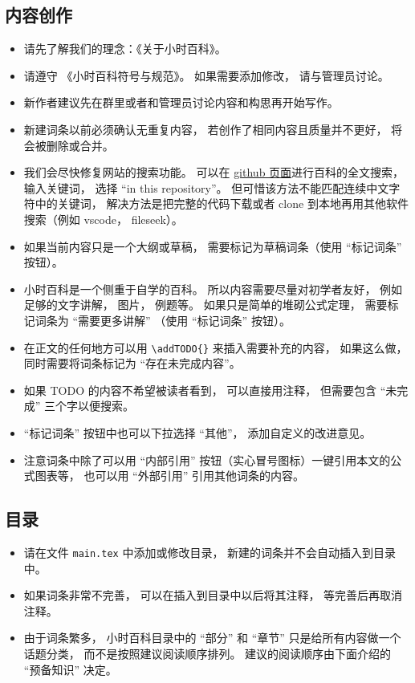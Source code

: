 
\subsection{内容创作}
\begin{itemize}
\item 请先了解我们的理念：《关于小时百科》。
\item 请遵守 《小时百科符号与规范》。 如果需要添加修改， 请与管理员讨论。
\item 新作者建议先在群里或者和管理员讨论内容和构思再开始写作。
\item 新建词条以前必须确认无重复内容， 若创作了相同内容且质量并不更好， 将会被删除或合并。
\item 我们会尽快修复网站的搜索功能。 可以在 \href{https://github.com/MacroUniverse/PhysWiki-log}{github 页面}进行百科的全文搜索， 输入关键词， 选择 “in this repository”。 但可惜该方法不能匹配连续中文字符中的关键词， 解决方法是把完整的代码下载或者 clone 到本地再用其他软件搜索（例如 vscode， fileseek）。
\item 如果当前内容只是一个大纲或草稿， 需要标记为草稿词条（使用 “标记词条” 按钮）。
\item 小时百科是一个侧重于自学的百科。 所以内容需要尽量对初学者友好， 例如足够的文字讲解， 图片， 例题等。 如果只是简单的堆砌公式定理， 需要标记词条为 “需要更多讲解” （使用 “标记词条” 按钮）。
\item 在正文的任何地方可以用 \verb|\addTODO{}| 来插入需要补充的内容， 如果这么做， 同时需要将词条标记为 “存在未完成内容”。
\item 如果 TODO 的内容不希望被读者看到， 可以直接用注释， 但需要包含 “未完成” 三个字以便搜索。
\item “标记词条” 按钮中也可以下拉选择 “其他”， 添加自定义的改进意见。
\item 注意词条中除了可以用 “内部引用” 按钮（实心冒号图标）一键引用本文的公式图表等， 也可以用 “外部引用” 引用其他词条的内容。
\end{itemize}

\subsection{目录}
\begin{itemize}
\item 请在文件 \verb|main.tex| 中添加或修改目录， 新建的词条并不会自动插入到目录中。
\item 如果词条非常不完善， 可以在插入到目录中以后将其注释， 等完善后再取消注释。
\item 由于词条繁多， 小时百科目录中的 “部分” 和 “章节” 只是给所有内容做一个话题分类， 而不是按照建议阅读顺序排列。 建议的阅读顺序由下面介绍的 “预备知识” 决定。
\end{itemize}

